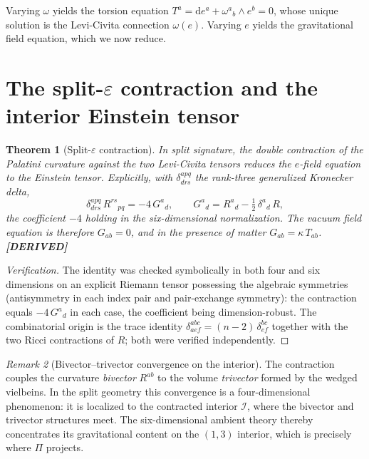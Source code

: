 \documentclass[11pt,oneside]{book}
\newcommand{\dd}{\mathrm{d}}
\newcommand{\status}[1]{{\sffamily\bfseries\color{statuscol}[#1]}}
\theoremstyle{plain}
\newtheorem{theorem}{Theorem}[chapter]
\theoremstyle{definition}
\theoremstyle{remark}
\newtheorem{remark}[theorem]{Remark}
\begin{document}
Varying $\omega$ yields the torsion equation
$T^a=\dd e^a+\omega^a{}_b\wedge e^b=0$, whose unique solution is the Levi-Civita
connection $\omega(e)$. Varying $e$ yields the gravitational field equation, which
we now reduce.

\section{The split-$\varepsilon$ contraction and the interior Einstein tensor}
\label{sec:split-eps}

\begin{theorem}[Split-$\varepsilon$ contraction]
\label{thm:splitcontraction}
In split signature, the double contraction of the Palatini curvature against the
two Levi-Civita tensors reduces the $e$-field equation to the Einstein tensor.
Explicitly, with $\delta^{apq}_{drs}$ the rank-three generalized Kronecker delta,
\[
  \delta^{apq}_{drs}\,R^{rs}{}_{pq}=-4\,G^{a}{}_{d},
  \qquad
  G^{a}{}_{d}=R^{a}{}_{d}-\tfrac12\,\delta^{a}{}_{d}\,R,
\]
the coefficient $-4$ holding in the six-dimensional normalization. The vacuum
field equation is therefore $G_{ab}=0$, and in the presence of matter
$G_{ab}=\kappa\,T_{ab}$. \status{DERIVED}
\end{theorem}

\begin{proof}[Verification]
The identity was checked symbolically in both four and six dimensions on an
explicit Riemann tensor possessing the algebraic symmetries (antisymmetry in each
index pair and pair-exchange symmetry): the contraction equals $-4\,G^a{}_d$ in
each case, the coefficient being dimension-robust. The combinatorial origin is the
trace identity $\delta^{ab c}_{aef}=(n-2)\,\delta^{bc}_{ef}$ together with the
two Ricci contractions of $R$; both were verified independently.
\end{proof}

\begin{remark}[Bivector--trivector convergence on the interior]
\label{rem:bivector-trivector}
The contraction couples the curvature \emph{bivector} $R^{ab}$ to the volume
\emph{trivector} formed by the wedged vielbeins. In the split geometry this
convergence is a four-dimensional phenomenon: it is localized to the contracted
interior $\mathcal I$, where the bivector and trivector structures meet. The
six-dimensional ambient theory thereby concentrates its gravitational content on
the $(1,3)$ interior, which is precisely where $\Pi$ projects.
\end{remark}
\end{document}
